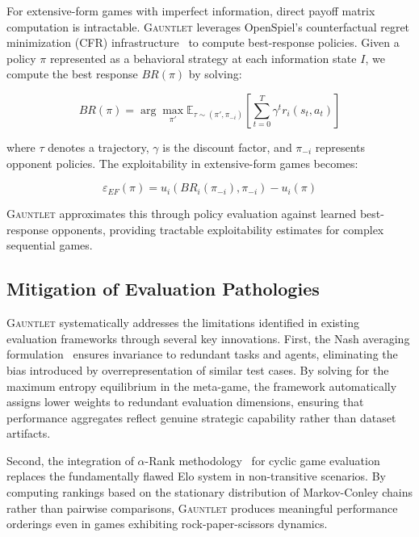 \documentclass[sigconf,anonymous]{aamas}
\begin{document}
For extensive-form games with imperfect information, direct payoff matrix computation is intractable. \textsc{Gauntlet} leverages OpenSpiel's counterfactual regret minimization (CFR) infrastructure~\cite{Lanctot2019OpenSpielOS} to compute best-response policies. Given a policy $\pi$ represented as a behavioral strategy at each information state $I$, we compute the best response $BR(\pi)$ by solving:

\begin{equation}
BR(\pi) = \arg\max_{\pi'} \mathbb{E}_{\tau \sim (\pi', \pi_{-i})}\left[\sum_{t=0}^{T} \gamma^t r_i(s_t, a_t)\right]
\label{eq:best_response}
\end{equation}

where $\tau$ denotes a trajectory, $\gamma$ is the discount factor, and $\pi_{-i}$ represents opponent policies. The exploitability in extensive-form games becomes:

\begin{equation}
\varepsilon_{EF}(\pi) = u_i(BR_i(\pi_{-i}), \pi_{-i}) - u_i(\pi)
\label{eq:ef_exploitability}
\end{equation}

\textsc{Gauntlet} approximates this through policy evaluation against learned best-response opponents, providing tractable exploitability estimates for complex sequential games.

\subsection{Mitigation of Evaluation Pathologies}

\textsc{Gauntlet} systematically addresses the limitations identified in existing evaluation frameworks through several key innovations. First, the Nash averaging formulation~\cite{Balduzzi2018} ensures invariance to redundant tasks and agents, eliminating the bias introduced by overrepresentation of similar test cases. By solving for the maximum entropy equilibrium in the meta-game, the framework automatically assigns lower weights to redundant evaluation dimensions, ensuring that performance aggregates reflect genuine strategic capability rather than dataset artifacts.

Second, the integration of $\alpha$-Rank methodology~\cite{Omidshafiei2019} for cyclic game evaluation replaces the fundamentally flawed Elo system in non-transitive scenarios. By computing rankings based on the stationary distribution of Markov-Conley chains rather than pairwise comparisons, \textsc{Gauntlet} produces meaningful performance orderings even in games exhibiting rock-paper-scissors dynamics.
\end{document}

